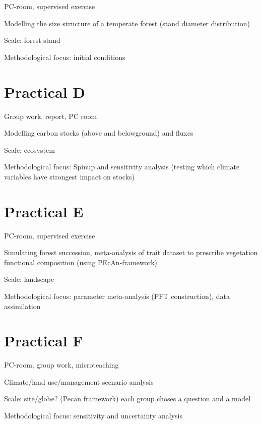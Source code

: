 \documentclass[]{book}
\begin{document}
PC-room, supervised exercise

Modelling the size structure of a temperate forest (stand diameter
distribution)

Scale: forest stand

Methodological focus: initial conditions

\chapter*{Practical D}\label{practical-d}

Group work, report, PC room

Modelling carbon stocks (above and belowground) and fluxes

Scale: ecosystem

Methodological focus: Spinup and sensitivity analysis (testing which
climate variables have strongest impact on stocks)

\chapter*{Practical E}\label{practical-e}

PC-room, supervised exercise

Simulating forest succession, meta-analysis of trait dataset to
prescribe vegetation functional composition (using PEcAn-framework)

Scale: landscape

Methodological focus: parameter meta-analysis (PFT construction), data
assimilation

\chapter*{Practical F}\label{practical-f}

PC-room, group work, microteaching

Climate/land use/management scenario analysis

Scale: site/globe? (Pecan framework) each group choses a question and a
model

Methodological focus: sensitivity and uncertainty analysis


\end{document}
